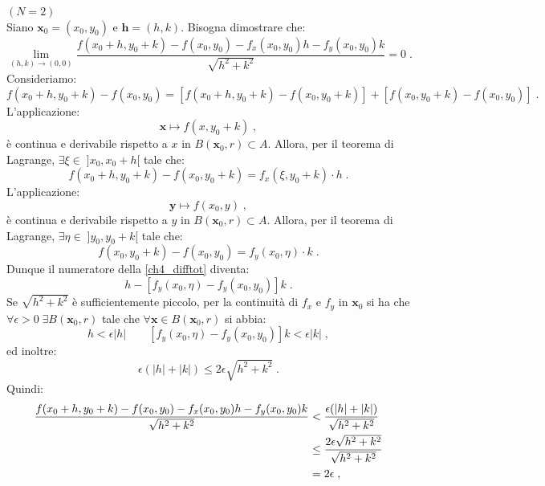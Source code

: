 \documentclass[a4paper,12pt]{report}
\theoremstyle{plain}
\theoremstyle{definition}
\theoremstyle{remark}
\numberwithin{equation}{section}
\begin{document}
\proof $(N=2)$ \\
Siano $\mathbf{x}_0=(x_0,y_0)$ e $\mathbf{h}=(h,k)$. Bisogna dimostrare che:
\begin{equation}
\lim_{(h,k) \to (0,0)} \frac{f(x_0+h,y_0+k)-f(x_0,y_0)-f_x(x_0,y_0)h-f_y(x_0,y_0)k}{\sqrt{h^2+k^2}}=0\;. \qquad \label{ch4_difftot}
\end{equation}
Consideriamo:
\begin{equation}
f(x_0+h,y_0+k)-f(x_0,y_0)=[f(x_0+h,y_0+k)-f(x_0,y_0+k)]+[f(x_0,y_0+k)-f(x_0,y_0)]\;.
\end{equation}
L'applicazione:
\begin{equation}
\mathbf{x} \longmapsto f(x,y_0+k)\;,
\end{equation}
è continua e derivabile rispetto a $x$ in $B(\mathbf{x}_0,r) \subset A$. Allora, per il teorema di Lagrange, $\exists \xi \in\; ]x_0,x_0+h[$ 
tale che:
\begin{equation}
f(x_0+h,y_0+k)-f(x_0,y_0+k)=f_x(\xi,y_0+k)\cdot h\;. \label{ch4_difftot2}
\end{equation}
L'applicazione:
\begin{equation}
\mathbf{y} \longmapsto f(x_0,y)\;,
\end{equation}
è continua e derivabile rispetto a $y$ in $B(\mathbf{x}_0,r) \subset A$. Allora, per il teorema di Lagrange, $\exists \eta \in\; ]y_0,y_0+k[
$ tale che:
\begin{equation}
f(x_0,y_0+k)-f(x_0,y_0)=f_y(x_0,\eta)\cdot k\;.
\end{equation}
Dunque il numeratore della \eqref{ch4_difftot} diventa:
\begin{equation}
[f_x(\xi,y_0+k)-f_x(x_0,y_0)]h-[f_y(x_0,\eta)-f_y(x_0,y_0)]k\;.
\end{equation}
Se $\sqrt{h^2+k^2}$ è sufficientemente piccolo, per la continuità di $f_x$ e $f_y$ in $\mathbf{x}_0$ si ha che $\forall \epsilon>0\; 
\exists B(\mathbf{x}_0,r)$ tale che $\forall \mathbf{x} \in B(\mathbf{x}_0,r)$ si abbia:
\begin{equation}
[f_x(\xi,y_0+k)-f_x(x_0,y_0)]h < \epsilon |h| \qquad [f_y(x_0,\eta)-f_y(x_0,y_0)]k < \epsilon |k|\;,
\end{equation}
ed inoltre:
\begin{equation}
\epsilon(|h|+|k|) \le 2\epsilon\sqrt{h^2+k^2}\;.
\end{equation}
Quindi:
\begin{align}
\frac{f(x_0+h,y_0+k)-f(x_0,y_0)-f_x(x_0,y_0)h-f_y(x_0,y_0)k}{\sqrt{h^2+k^2}} &< \frac{\epsilon(|h|+|k|)}{\sqrt{h^2+k^2}} \notag \\
&\le \frac{2\epsilon\sqrt{h^2+k^2}}{\sqrt{h^2+k^2}} \notag \\
&=2\epsilon\;,
\end{align}
\end{document}
